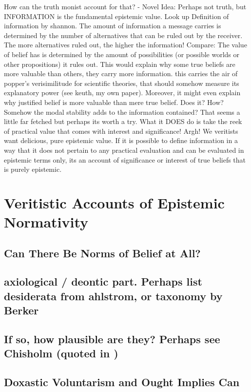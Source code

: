 \documentclass[12pt,numbers=noenddot]{scrartcl}
\begin{document}
    How can the truth monist account for that? - Novel Idea: Perhaps not truth, but INFORMATION is the fundamental epistemic value. Look up Definition of information by shannon. The amount of information a message carries is determined by the number of alternatives that can be ruled out by the receiver. The more alternatives ruled out, the higher the information! Compare: The value of belief has is determined by the amount of possibilities (or possible worlds or other propositions) it rules out. This would explain why some true beliefs are more valuable than others, they carry more information. this carries the air of popper's verisimilitude for scientific theories, that should somehow measure its explanatory power (see keuth, my own paper).
    Moreover, it might even explain why justified belief is more valuable than mere true belief. Does it? How? Somehow the modal stability adds to the information contained? That seems a little far fetched but perhaps its worth a try. 
    What it DOES do is take the reek of practical value that comes with interest and significance! Argh! We veritists want delicious, pure epistemic value. If it is possible to define information in a way that it does not pertain to any practical evaluation and can be evaluated in epistemic terms only, its an account of significance or interest of true beliefs that is purely epistemic.

\section{Veritistic Accounts of Epistemic Normativity}
\subsection{Can There Be Norms of Belief at All?}
\subsection{ axiological / deontic part. Perhaps list desiderata from ahlstrom, or taxonomy by Berker}
\subsection{ If so, how plausible are they? Perhaps see Chisholm (quoted in \textcite{Goldman2002-GOLTUO-2})}
\subsection{Doxastic Voluntarism and Ought Implies Can}
\end{document}
